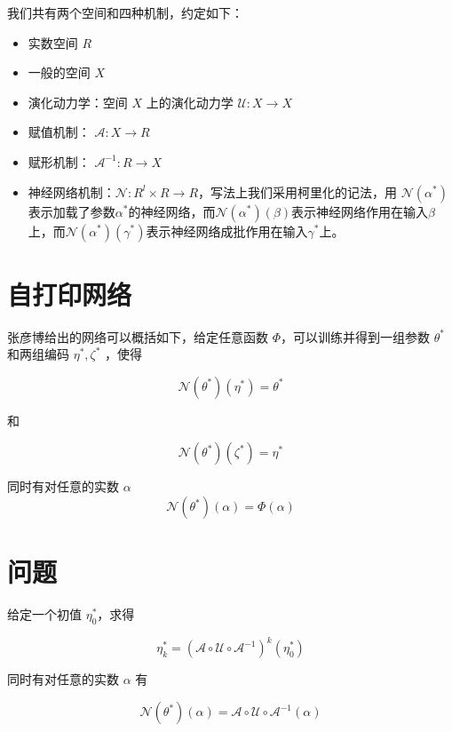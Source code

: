 \documentclass[a4paper,12pt]{article}
\begin{document}
我们共有两个空间和四种机制，约定如下：
\begin{itemize}
  \item 实数空间 $R$
  \item 一般的空间 $X$
  \item 演化动力学：空间 $X$ 上的演化动力学 $\mathcal{U}: X \to X$
  \item 赋值机制： $\mathcal{A}: X \to R$
  \item 赋形机制： $\mathcal{A}^{-1}: R \to X$
  \item 神经网络机制：$\mathcal{N}: R^l \times R \to R$，写法上我们采用柯里化的记法，用 $\mathcal{N}(\alpha^*)$ 表示加载了参数$\alpha^*$的神经网络，而$\mathcal{N}(\alpha^*)(\beta)$表示神经网络作用在输入$\beta$上，而$\mathcal{N}(\alpha^*)(\gamma^*)$表示神经网络成批作用在输入$\gamma^*$上。
\end{itemize}

\section{自打印网络}

张彦博给出的网络可以概括如下，给定任意函数 $\varPhi$，可以训练并得到一组参数 $\theta^*$ 和两组编码 $\eta^*, \zeta^*$ ，使得

$$
\mathcal{N}(\theta^*)(\eta^*) = \theta^*
$$

和

$$
\mathcal{N}(\theta^*)(\zeta^*) = \eta^*
$$

同时有对任意的实数 $\alpha$
$$
\mathcal{N}(\theta^*)(\alpha) = \varPhi(\alpha)
$$

\section{问题}

给定一个初值 $\eta^*_0$，求得

$$\eta^*_k=(\mathcal{A} \circ \mathcal{U} \circ \mathcal{A}^{-1})^k (\eta^*_0)$$

同时有对任意的实数 $\alpha$ 有

$$
\mathcal{N}(\theta^*)(\alpha) = \mathcal{A} \circ \mathcal{U} \circ \mathcal{A}^{-1} (\alpha)
$$
\end{document}
